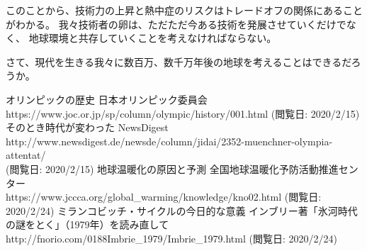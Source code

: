 \documentclass[]{jsarticle}
\begin{document}
このことから、技術力の上昇と熱中症のリスクはトレードオフの関係にあることがわかる。
我々技術者の卵は、ただただ今ある技術を発展させていくだけでなく、
地球環境と共存していくことを考えなければならない。

さて、現代を生きる我々に数百万、数千万年後の地球を考えることはできるだろうか。

\begin{thebibliography}{99}
     オリンピックの歴史 日本オリンピック委員会 \\
        https://www.joc.or.jp/sp/column/olympic/history/001.html
        (閲覧日: 2020/2/15)
     そのとき時代が変わった NewsDigest \\
        http://www.newsdigest.de/newsde/column/jidai/2352-muenchner-olympia-attentat/ \\
        (閲覧日: 2020/2/15)
     地球温暖化の原因と予測 全国地球温暖化予防活動推進センター \\
        https://www.jccca.org/global\_warming/knowledge/kno02.html
        (閲覧日: 2020/2/24)
     ミランコビッチ・サイクルの今日的な意義 インブリー著「氷河時代の謎をとく」（1979年）を読み直して \\
        http://fnorio.com/0188Imbrie\_1979/Imbrie\_1979.html
        (閲覧日: 2020/2/24)
\end{thebibliography}
\end{document}
